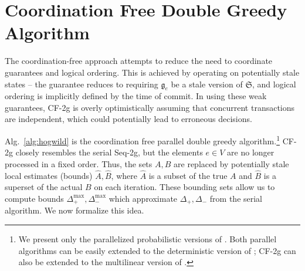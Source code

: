 \documentclass{article} %
\newcommand{\hogwild}{CF-2g}
\newcommand{\seqalg}{Seq-2g}
\newcommand{\Comments}{1}
\newcommand{\note}[2]{\ifnum\Comments=1\textcolor{#1}{#2}\fi}
\newcommand{\xinghao}[1]{\note{red}{[XP: #1]}}
\newcommand{\algref}[1]{Alg.~\ref{#1}}
\begin{document}
\section{Coordination Free Double Greedy Algorithm \label{sec:alghogwild}}
The coordination-free approach attempts to reduce the need to coordinate guarantees and logical ordering.
This is achieved by operating on potentially stale states -- the guarantee reduces to requiring $\mathfrak{g}_e$ be a stale version of $\mathfrak{S}$, and logical ordering is implicitly defined by the time of commit.
In using these weak guarantees, \hogwild{} is overly optimistically assuming that concurrent transactions are independent, which could potentially lead to erroneous decisions.

\algref{alg:hogwild} is the coordination free parallel double greedy algorithm.\footnote{We present only the parallelized probabilistic versions of \cite{buchbinder2012}.
Both parallel algorithms can be easily extended to the deterministic version of \cite{buchbinder2012}; \hogwild{} can also be extended to the multilinear version of \cite{buchbinder2012}.}
\hogwild{} closely resembles the serial \seqalg{}, but the elements $e \in V$ are no longer processed in a fixed order.
Thus, the sets $A, B$ are replaced by potentially stale local estimates (bounds) $\hat{A}, \hat{B}$, where $\hat{A}$ is a subset of the true $A$ and $\hat{B}$ is a superset of the actual $B$ on each iteration.
These bounding sets allow us to compute bounds $\Delta_{+}^{\max}, \Delta_{-}^{\max}$ which approximate $\Delta_{+}, \Delta_{-}$ from the serial algorithm.
We now formalize this idea.
\end{document}
